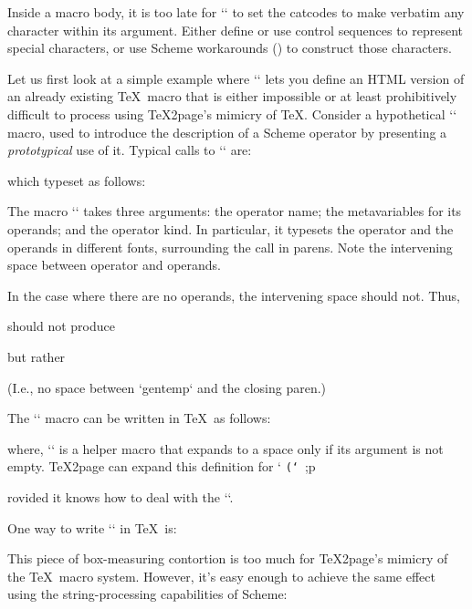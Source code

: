 Inside a macro body, it is too late for `\eval` to set the catcodes
to make verbatim any character within its argument.  Either define or
use control sequences to represent special characters, or use Scheme
workarounds () to construct those characters.

Let us first look at a simple example where
`\eval` lets you define an HTML version of an already
existing \TeX\ macro that is either impossible or at
least prohibitively difficult  to process using
\TeX2page’s  mimicry of \TeX.  Consider a hypothetical
`\proto` macro, used to introduce the description of
a Scheme operator by presenting a {\em prototypical}
use of it.
Typical calls to `\proto` are:

\begintt
{}
\endtt
%
which typeset as follows:

\quote
{}
\endquote
The macro `\proto` takes three arguments: the
operator name; the metavariables for its operands;
and the operator kind.  In particular, it typesets
the operator and the operands in different fonts,
surrounding the call in parens.  Note the
intervening space between operator and operands.

In the case where there are no operands, the intervening
space should not.  Thus,

\begintt
{}
\endtt
%
should not produce

\quote
{}
\endquote
but rather

\quote
{}
\endquote
(I.e., no space between `gentemp` and the
closing paren.)


The `\proto` macro can be written
in \TeX\ as follows:

\begintt
\def\proto#1#2#3{\noindent
  \hbox{{\tt(#1}\spaceifnotempty{#2}{\it#2}{\tt)}%
    \qquad ;#3}\par}
\endtt
%
where, `\spaceifnotempty` is a helper macro
that expands to a space only if its argument is
not empty.  \TeX2page can expand this definition
for `\proto`, provided it knows how to deal
with the `\spaceifnotempty`.

One way to write `\spaceifnotempty` in \TeX\
is:

\begintt
\newdimen\templen
\newbox\tempbox

\def\spaceifnotempty#1{%
  \setbox\tempbox\hbox{#1}%
  \templen\wd\tempbox
  \ifdim\templen>0pt{\ }\fi}
\endtt
%
This piece of box-measuring contortion is
too much for \TeX2page’s mimicry of the \TeX\ macro
system.  However, it’s easy enough to  achieve the
same effect using the string-processing capabilities
of Scheme:

